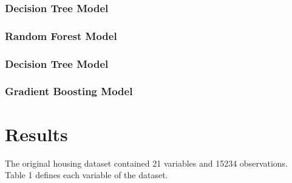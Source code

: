 \documentclass[11pt,]{article}
\begin{document}
\hypertarget{decision-tree-model}{%
\subsubsection{\texorpdfstring{\textbf{Decision Tree Model}\\
}{Decision Tree Model }}\label{decision-tree-model}}

\hypertarget{random-forest-model}{%
\subsubsection{\texorpdfstring{\textbf{Random Forest Model}\\
}{Random Forest Model }}\label{random-forest-model}}

\hypertarget{decision-tree-model-1}{%
\subsubsection{\texorpdfstring{\textbf{Decision Tree Model}\\
}{Decision Tree Model }}\label{decision-tree-model-1}}

\hypertarget{gradient-boosting-model}{%
\subsubsection{\texorpdfstring{\textbf{Gradient Boosting Model}\\
}{Gradient Boosting Model }}\label{gradient-boosting-model}}

\hypertarget{results}{%
\section{Results}\label{results}}

The original housing dataset contained 21 variables and 15234
observations. Table 1 defines each variable of the dataset.
\end{document}
